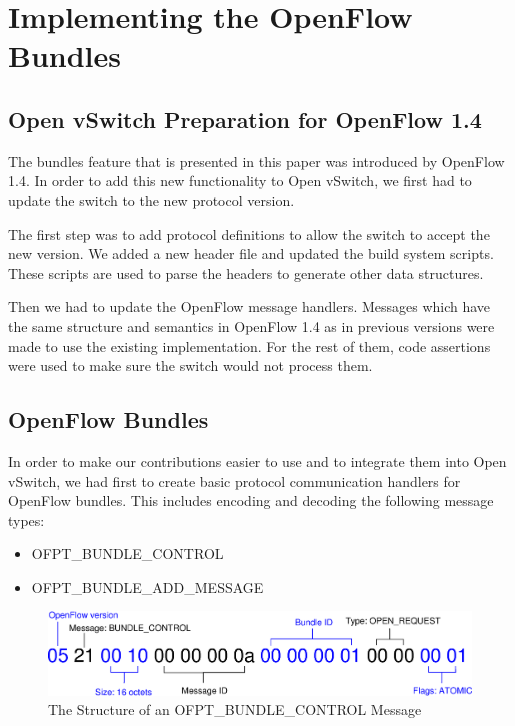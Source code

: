\chapter{Implementing the OpenFlow Bundles}
\label{chapter:impl}  
 
\section{Open vSwitch Preparation for OpenFlow 1.4}

The bundles feature that is presented in this paper was introduced by OpenFlow 1.4. In order to add
this new functionality to Open vSwitch, we first had to update the switch to the new protocol version.

The first step was to add protocol definitions to allow the switch to accept the new version. We added
a new header file and updated the build system scripts. These scripts are used to parse the headers
to generate other data structures.

Then we had to update the OpenFlow message handlers. Messages which have the same structure and semantics
in OpenFlow 1.4 as in previous versions were made to use the existing implementation. For the rest of
them, code assertions were used to make sure the switch would not process them.

\section{OpenFlow Bundles}

In order to make our contributions easier to use and to integrate them into Open vSwitch,
we had first to create basic protocol communication handlers for OpenFlow bundles. This
includes encoding and decoding the following message types:
\begin{itemize}
 \item OFPT_BUNDLE_CONTROL
 \item OFPT_BUNDLE_ADD_MESSAGE
\end{itemize}


\begin{figure}[h]
\begin{center}
\includegraphics[scale=0.6]{src/img/bundle-open-message-bytes.eps}
\end{center}
\caption{The Structure of an OFPT_BUNDLE_CONTROL Message}
\label{fig:bundle-open-bytes}
\end{figure}

